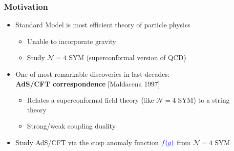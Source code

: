 \documentclass{beamer}
\begin{document}
\begin{frame}
\frametitle{Motivation}
\begin{itemize}
\item Standard Model is most efficient theory of particle physics
\begin{itemize}
\item Unable to incorporate gravity
\item Study $\mathcal{N}=4$ SYM (superconformal version of QCD)
\end{itemize}
\item One of most remarkable discoveries in last decades:\\
{\bf AdS/CFT correspondence} [Maldacena 1997]
\begin{itemize}
\item Relates a superconformal field theory (like $\mathcal{N}=4$ SYM) to a string theory
\item Strong/weak coupling duality
\end{itemize}
\item Study AdS/CFT via the cusp anomaly function ${\color{blue}f(g)}$ from $\mathcal{N}=4$ SYM
\end{itemize}
\end{frame}

\end{document}
